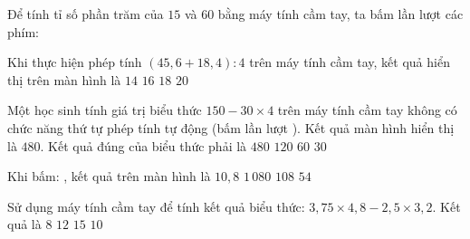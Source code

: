 \begin{ex} %
Để tính tỉ số phần trăm của $15$ và $60$ bằng máy tính cầm tay, ta bấm lần lượt các phím:
\choice
{\True {}  \fbox{$\div$}   \fbox{\%}}
{  \fbox{$\times$}   \fbox{=}}
{  \fbox{$\div$}   \fbox{=}}
{  \fbox{+}   \fbox{\%}}
\end{ex}

\begin{ex} %
Khi thực hiện phép tính $(45{,}6 + 18{,}4) : 4$ trên máy tính cầm tay, kết quả hiển thị trên màn hình là
\choice
{$14$}
{\True $16$}
{$18$}
{$20$}
\end{ex}

\begin{ex} %
Một học sinh tính giá trị biểu thức $150 - 30 \times 4$ trên máy tính cầm tay không có chức năng thứ tự phép tính tự động (bấm lần lượt  \fbox{--}  \fbox{$\times$}  \fbox{=}). Kết quả màn hình hiển thị là $480$. Kết quả đúng của biểu thức phải là
\choice
{$480$}
{$120$}
{$60$}
{\True $30$}
\end{ex}

\begin{ex} %
Khi bấm:    \fbox{$\times$}   \fbox{\%} \fbox{=}, kết quả trên màn hình là
\choice
{$10{,}8$}
{$1\,080$}
{\True $108$}
{$54$}
\end{ex}

\begin{ex} %
Sử dụng máy tính cầm tay để tính kết quả biểu thức: $3{,}75 \times 4{,}8 - 2{,}5 \times 3{,}2$. Kết quả là
\choice
{$8$}
{$12$}
{$15$}
{\True $10$}
\end{ex}

